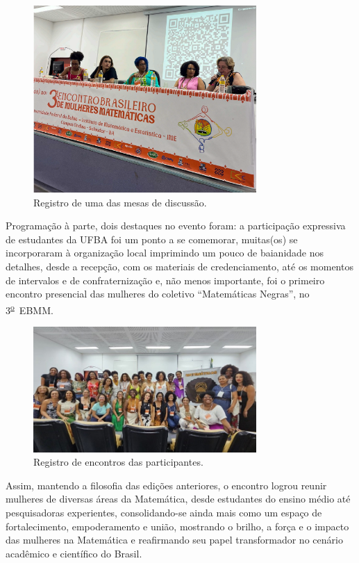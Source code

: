 \documentclass{hipatia}
\newcommand{\superou}{\textsuperscript{\underline{o}}~}
\begin{document}
\begin{figure}[htb]
    \centering
    \includegraphics[width=8.5cm]{EBMM1.png}
    \caption{Registro de uma das mesas de discussão.}
 \label{EBMM1}
\end{figure}

Programação à parte, dois destaques no evento foram: a participação expressiva de estudantes da UFBA foi um ponto a se comemorar, muitas(os) se incorporaram à organização local imprimindo um pouco de baianidade nos detalhes, desde a recepção, com os materiais de credenciamento, até os momentos de intervalos e de confraternização e, não menos importante, foi o primeiro encontro presencial das mulheres do coletivo ``Matemáticas Negras'', no 3\superou EBMM.

\begin{figure}[htb]
    \centering
    \includegraphics[width=8.5cm]{EBMM2.jpg}
    \caption{Registro de encontros das participantes.}
 \label{EBMM2}
\end{figure}

Assim, mantendo a filosofia das edições anteriores, o encontro logrou reunir mulheres de diversas áreas da Matemática, desde estudantes do ensino médio até pesquisadoras experientes, consolidando-se ainda mais como um espaço de fortalecimento, empoderamento e união, mostrando o brilho, a força e o impacto das mulheres na Matemática e reafirmando seu papel transformador no cenário acadêmico e científico do Brasil.
\end{document}
